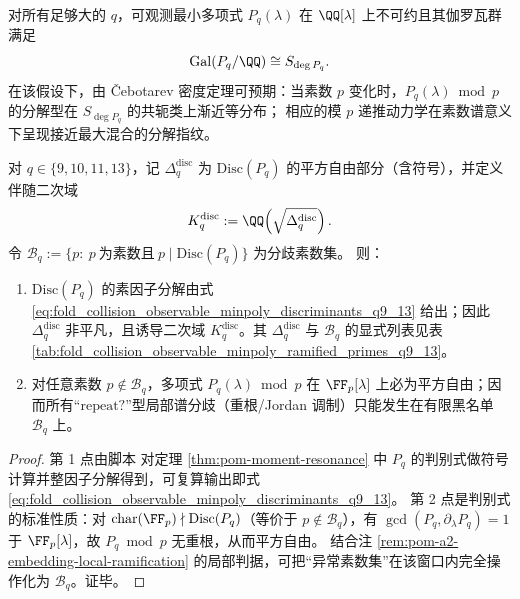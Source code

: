 \begin{conjecture}[全对称伽罗瓦群与素数谱随机性]\label{conj:pom-resonance-minpoly-galois-sd}
对所有足够大的 \(q\)，可观测最小多项式 \(P_q(\lambda)\) 在 \(\QQ[\lambda]\) 上不可约且其伽罗瓦群满足
\[
\mathrm{Gal}(P_q/\QQ)\cong S_{\deg P_q}.
\]
在该假设下，由 Čebotarev 密度定理可预期：当素数 \(p\) 变化时，\(P_q(\lambda)\bmod p\) 的分解型在 \(S_{\deg P_q}\) 的共轭类上渐近等分布；
相应的模 \(p\) 递推动力学在素数谱意义下呈现接近最大混合的分解指纹。
\end{conjecture}

\begin{proposition}[判别式黑名单与分歧素数集：局部谱分歧仅可能发生在 \texorpdfstring{$p\mid \mathrm{Disc}(P_q)$}{p|Disc(Pq)}（\(q=9,10,11,13\)，可审计）]\label{prop:pom-observable-minpoly-discriminant-ramification-q9-13}
对 \(q\in\{9,10,11,13\}\)，记 \(\Delta_q^{\mathrm{disc}}\) 为 \(\mathrm{Disc}(P_q)\) 的平方自由部分（含符号），并定义伴随二次域
\[
K_q^{\mathrm{disc}}:=\QQ\!\left(\sqrt{\Delta_q^{\mathrm{disc}}}\right).
\]
令
\(
\mathcal{B}_q:=\{p:\ p\ \text{为素数且}\ p\mid \mathrm{Disc}(P_q)\}
\)
为分歧素数集。
则：
\begin{enumerate}
  \item \(\mathrm{Disc}(P_q)\) 的素因子分解由式 \eqref{eq:fold_collision_observable_minpoly_discriminants_q9_13} 给出；因此 \(\Delta_q^{\mathrm{disc}}\) 非平凡，且诱导二次域 \(K_q^{\mathrm{disc}}\)。其 \(\Delta_q^{\mathrm{disc}}\) 与 \(\mathcal{B}_q\) 的显式列表见表 \ref{tab:fold_collision_observable_minpoly_ramified_primes_q9_13}。
  \item 对任意素数 \(p\notin\mathcal{B}_q\)，多项式 \(P_q(\lambda)\bmod p\) 在 \(\FF_p[\lambda]\) 上必为平方自由；因而所有“\(\mathrm{repeat?}\)”型局部谱分歧（重根/Jordan 调制）只能发生在有限黑名单 \(\mathcal{B}_q\) 上。
\end{enumerate}
\end{proposition}
\begin{proof}
第 1 点由脚本  对定理 \ref{thm:pom-moment-resonance} 中 \(P_q\) 的判别式做符号计算并整因子分解得到，可复算输出即式 \eqref{eq:fold_collision_observable_minpoly_discriminants_q9_13}。
第 2 点是判别式的标准性质：对 \(\mathrm{char}(\FF_p)\nmid \mathrm{Disc}(P_q)\)（等价于 \(p\notin\mathcal{B}_q\)），有
\(\gcd(P_q,\partial_\lambda P_q)=1\) 于 \(\FF_p[\lambda]\)，故 \(P_q\bmod p\) 无重根，从而平方自由。
结合注 \ref{rem:pom-a2-embedding-local-ramification} 的局部判据，可把“异常素数集”在该窗口内完全操作化为 \(\mathcal{B}_q\)。证毕。
\end{proof}



